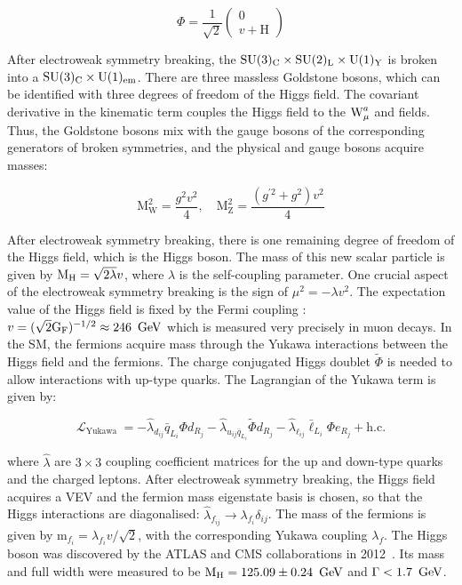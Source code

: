 \begin{equation}
  \Phi=\frac{1}{\sqrt{2}}\left(
  \begin{array}{c}
    0 \\
    v + \text{H}
  \end{array}\right)
\end{equation}

After electroweak symmetry breaking, the $\text{SU}(3)_{\text{C}} \times \text{SU}(2)_{\text{L}} \times \text{U}(1)_{\text{Y}}$ is broken into a $\text{SU}(3)_{\text{C}} \times \text{U}(1)_{\text{em}}$. There are three massless Goldstone bosons, which can be identified with three degrees of freedom of the Higgs field. The covariant derivative in the kinematic term couples the Higgs field to the $\text{W}_{\mu}^{a}$ and \bmu fields. Thus, the Goldstone bosons mix with the gauge bosons of the corresponding generators of broken symmetries, and the physical \PW and \PZ gauge bosons acquire masses:

\begin{equation}
  \text{M}_{\text{W}}^2=\frac{g^2 v^2}{4}, \quad \text{M}_{\text{Z}}^2=\frac{(g^{\prime 2}+g^2) v^2}{4}
\end{equation}

After electroweak symmetry breaking, there is one remaining degree of freedom of the Higgs field, which is the Higgs boson. The mass of this new scalar particle is given by $\text{M}_{\text{H}} = \sqrt{2 \lambda} v$, where $\lambda$ is the self-coupling parameter. One crucial aspect of the electroweak symmetry breaking is the sign of $\mu^2=-\lambda v^2$. The expectation value of the Higgs field is fixed by the Fermi coupling \gf: $v=(\sqrt{2} \text{G}_{\text{F}})^{-1 / 2} \approx 246~\,\text{Ge\hspace{-.08em}V}$ which is measured very precisely in muon decays. In the SM, the fermions acquire mass through the Yukawa interactions between the Higgs field and the fermions. The charge conjugated Higgs doublet $\tilde{\Phi}$ is needed to allow interactions with up-type quarks. The Lagrangian of the Yukawa term is given by:

\begin{equation}
  \mathcal{L}_{\text {Yukawa }}=-\hat{\lambda}_{d_{i j}} \bar{q}_{L_{i}} \Phi d_{R_{j}}-\hat{\lambda}_{u_{i j} \bar{q}_{L_{i}}} \tilde{\Phi} d_{R_{j}}-\hat{\lambda}_{\ell_{i j}} \bar{\ell}_{L_{i}} \Phi e_{R_{j}}+\text {h.c.}
\end{equation}

where $\hat{\lambda}$ are $3 \times 3$ coupling coefficient matrices for the up and down-type quarks and the charged leptons. After electroweak symmetry breaking, the Higgs field acquires a VEV and the fermion mass eigenstate basis is chosen, so that the Higgs interactions are diagonalised: $\hat{\lambda}_{f_{i j}} \to \lambda_{f_{i}} \delta_{i j}$. The mass of the fermions is given by $\text{m}_{f_{i}} = \lambda_{f_{i}} v / \sqrt{2}$, with the corresponding Yukawa coupling $\lambda_{f}$. The Higgs boson was discovered by the ATLAS and CMS collaborations in 2012~\cite{Chatrchyan:2013lba}. Its mass and full width were measured to be $\text{M}_{\text{H}} = 125.09 \pm 0.24~\,\text{Ge\hspace{-.08em}V}$ and $\Gamma < 1.7~\,\text{Ge\hspace{-.08em}V}$.


